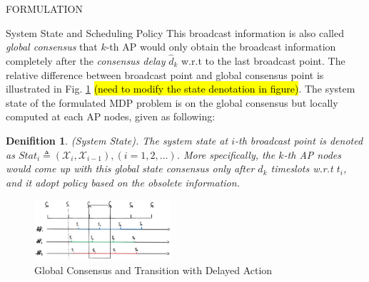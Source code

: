 \documentclass[10pt, conference, letterpaper]{IEEEtran}
\newtheorem{definition}{Denifition}
\newcommand{\define}{\triangleq}
\newcommand{\Obsv}{\mathcal{X}}
\begin{document}
\begin{section}{FORMULATION}
\begin{subsection}{System State and Scheduling Policy}
            This broadcast information is also called \emph{global consensus} that $k$-th AP would only obtain the broadcast information completely after the \emph{consensus delay} $\hat{d}_{k}$ w.r.t to the last broadcast point. The relative difference between broadcast point and global consensus point is illustrated in Fig. \ref{fig:br-trans} \hl{(need to modify the state denotation in figure)}.
            The system state of the formulated MDP problem is on the global consensus but locally computed at each AP nodes, given as following:
            \begin{definition}(System State).
                The system state at $i$-th broadcast point is denoted as $Stat_i \define (\Obsv_{i}, \Obsv_{i-1}), (i=1,2,\dots)$.
                More specifically, the $k$-th AP nodes would come up with this global state consensus only after $\hat{d}_k$ timeslots w.r.t $t_i$, and it adopt policy based on the obsolete information.
            \end{definition}
            \begin{figure}[ht]
                \centering
                \includegraphics[width=0.45\textwidth]{broadcast-trans.png}
                \caption{Global Consensus and Transition with Delayed Action}
                \label{fig:br-trans}
            \end{figure}


\end{subsection}
\end{section}
\end{document}
